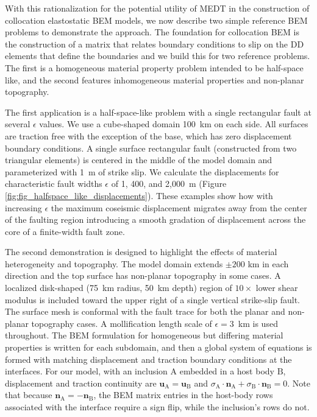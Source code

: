 \documentclass[12pt]{article}
\newcommand{\ve}[1]{\mathbf{#1}}
\newcommand{\eps}{\epsilon}
\newcommand{\normal}{\mathbf n}
\begin{document}
With this rationalization for the potential utility of MEDT in the construction of collocation elastostatic BEM models, we now describe two simple reference BEM problems to demonstrate the approach.  The foundation for collocation BEM is the construction of a matrix that relates boundary conditions to slip on the DD elements that define the boundaries \citep[e.g.,][]{CrouchStarfield1983, BrebbiaTellesWrobel1984, Bonnet1995, Aliabadi2002} and we build this for two reference problems.  The first is a homogeneous material property problem intended to be half-space like, and the second features inhomogeneous material properties and non-planar topography.

The first application is a half-space-like problem with a single rectangular fault at several $\eps$ values. We use a cube-shaped domain 100~km on each side.  All surfaces are traction free with the exception of the base, which has zero displacement boundary conditions.  A single surface rectangular fault (constructed from two triangular elements) is centered in the middle of the model domain and parameterized with 1~m of strike slip. We calculate the displacements for characteristic fault widths $\eps$ of 1, 400, and 2,000~m (Figure \ref{fig:fig_halfspace_like_displacements}).  These examples show how with increasing $\eps$ the maximum coseismic displacement migrates away from the center of the faulting region introducing a smooth gradation of displacement across the core of a finite-width fault zone.

The second demonstration is designed to highlight the effects of material heterogeneity and topography.  The model domain extends $\pm200$ km in each direction and the top surface has non-planar topography in some cases. A localized disk-shaped (75~km radius, 50~km depth) region of $10\times$ lower shear modulus is included toward the upper right of a single vertical strike-slip fault.  The surface mesh is conformal with the fault trace for both the planar and non-planar topography cases.  A mollification length scale of $\eps = 3$~km is used throughout.  The BEM formulation for homogeneous but differing material properties is written for each subdomain, and then a global system of equations is formed with matching displacement and traction boundary conditions at the interfaces.  For our model, with an inclusion $\mathrm A$ embedded in a host body $\mathrm B$, displacement and traction continuity are $\ve u_{\mathrm A} = \ve u_{\mathrm B}$ and $\sigma_{\mathrm A} \cdot \normal_{\mathrm A} + \sigma_{\mathrm B} \cdot \normal_{\mathrm B} = 0$.  Note that because $\normal_{\mathrm A} = -\normal_{\mathrm B}$, the BEM matrix entries in the host-body rows associated with the interface require a sign flip, while the inclusion's rows do not.
\end{document}
